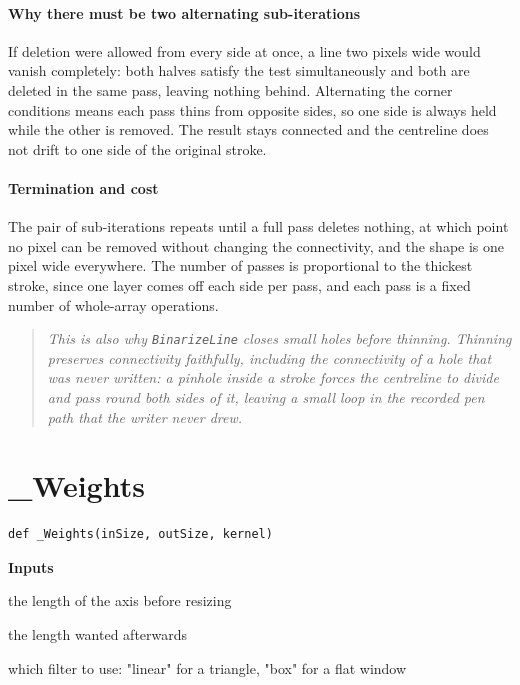 \paragraph{Why there must be two alternating sub-iterations}
If deletion were allowed from every side at once, a line two pixels wide would vanish completely: both halves satisfy the test simultaneously and both are deleted in the same pass, leaving nothing behind. Alternating the corner conditions means each pass thins from opposite sides, so one side is always held while the other is removed. The result stays connected and the centreline does not drift to one side of the original stroke.


\paragraph{Termination and cost}
The pair of sub-iterations repeats until a full pass deletes nothing, at which point no pixel can be removed without changing the connectivity, and the shape is one pixel wide everywhere. The number of passes is proportional to the thickest stroke, since one layer comes off each side per pass, and each pass is a fixed number of whole-array operations.


\begin{quote}\small\itshape This is also why \texttt{BinarizeLine} closes small holes before thinning. Thinning preserves connectivity faithfully, including the connectivity of a hole that was never written: a pinhole inside a stroke forces the centreline to divide and pass round both sides of it, leaving a small loop in the recorded pen path that the writer never drew.\end{quote}

\section{\_Weights}
\begin{lstlisting}[style=sig]
def _Weights(inSize, outSize, kernel)
\end{lstlisting}

\noindent\textbf{Inputs}
\begin{description}[leftmargin=2.2em,style=nextline,font=\normalfont\ttfamily]\setlength\itemsep{1pt}
  \item[{inSize}] \normalfont the length of the axis before resizing
  \item[{outSize}] \normalfont the length wanted afterwards
  \item[{kernel}] \normalfont which filter to use: "linear" for a triangle, "box" for a flat window
\end{description}

